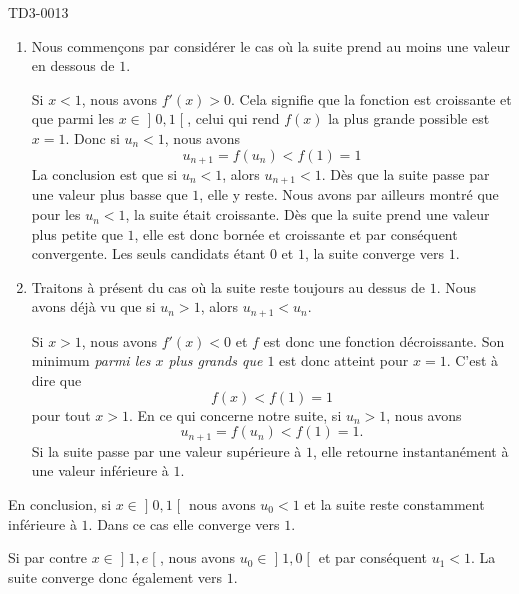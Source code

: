 \begin{corrige}{TD3-0013}
\begin{description}
            \begin{enumerate}
                \item
                    
                    Nous commençons par considérer le cas où la suite prend au moins une valeur en dessous de \( 1\).

                    Si \( x<1\), nous avons \( f'(x)>0\). Cela signifie que la fonction est croissante et que parmi les \( x\in\mathopen] 0 , 1 \mathclose[\), celui qui rend \( f(x)\) la plus grande possible est \( x=1\). Donc si \( u_n<1\), nous avons
    \begin{equation}
        u_{n+1}=f(u_n)<f(1)=1
    \end{equation}
    La conclusion est que si \( u_n<1\), alors \( u_{n+1}<1\). Dès que la suite passe par une valeur plus basse que \( 1\), elle y reste. Nous avons par ailleurs montré que pour les \( u_n<1\), la suite était croissante. Dès que la suite prend une valeur plus petite que \( 1\), elle est donc bornée et croissante et par conséquent convergente. Les seuls candidats étant \( 0\) et \( 1\), la suite converge vers \( 1\).

    
            \item

                Traitons à présent du cas où la suite reste toujours au dessus de \( 1\). Nous avons déjà vu que si \( u_n>1\), alors \( u_{n+1}<u_n\).

                Si \( x>1\), nous avons \( f'(x)<0\) et \( f\) est donc une fonction décroissante. Son minimum \emph{parmi les \( x\) plus grands que \( 1\)} est donc atteint pour \( x=1\). C'est à dire que
                \begin{equation}
                    f(x)<f(1)=1
                \end{equation}
                pour tout \( x>1\). En ce qui concerne notre suite, si \( u_n>1\), nous avons
                \begin{equation}
                    u_{n+1}=f(u_n)<f(1)=1.
                \end{equation}
                Si la suite passe par une valeur supérieure à \( 1\), elle retourne instantanément à une valeur inférieure à \( 1\).
    
            \end{enumerate}

    \end{description}
    
    En conclusion, si \( x\in\mathopen] 0 , 1 \mathclose[\) nous avons \( u_0<1\) et la suite reste constamment inférieure à \( 1\). Dans ce cas elle converge vers \( 1\).

    Si par contre \( x\in\mathopen] 1 , e \mathclose[\), nous avons \( u_0\in\mathopen] 1 , 0 \mathclose[\) et par conséquent \( u_1<1\). La suite converge donc également vers \( 1\).

\end{corrige}
